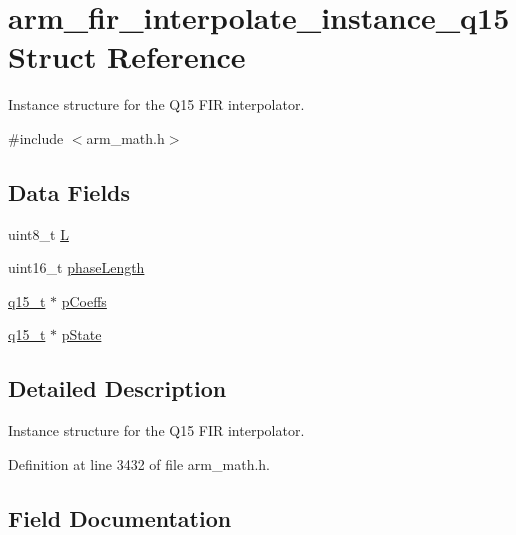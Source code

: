 \hypertarget{structarm__fir__interpolate__instance__q15}{}\section{arm\+\_\+fir\+\_\+interpolate\+\_\+instance\+\_\+q15 Struct Reference}
\label{structarm__fir__interpolate__instance__q15}


Instance structure for the Q15 F\+IR interpolator.  




{\ttfamily \#include $<$arm\+\_\+math.\+h$>$}

\subsection*{Data Fields}
\begin{DoxyCompactItemize}
\item 
uint8\+\_\+t \hyperlink{structarm__fir__interpolate__instance__q15_aee73cc056696e504430c53eaa9c58cf0}{L}
\item 
uint16\+\_\+t \hyperlink{structarm__fir__interpolate__instance__q15_a8f92bb07e0812f94679438cdf412b26a}{phase\+Length}
\item 
\hyperlink{arm__math_8h_ab5a8fb21a5b3b983d5f54f31614052ea}{q15\+\_\+t} $\ast$ \hyperlink{structarm__fir__interpolate__instance__q15_a7ca181a37f714d174445f486bebce26f}{p\+Coeffs}
\item 
\hyperlink{arm__math_8h_ab5a8fb21a5b3b983d5f54f31614052ea}{q15\+\_\+t} $\ast$ \hyperlink{structarm__fir__interpolate__instance__q15_ae29dfdb736374fcddaeaec4b7770170c}{p\+State}
\end{DoxyCompactItemize}


\subsection{Detailed Description}
Instance structure for the Q15 F\+IR interpolator. 

Definition at line 3432 of file arm\+\_\+math.\+h.



\subsection{Field Documentation}
